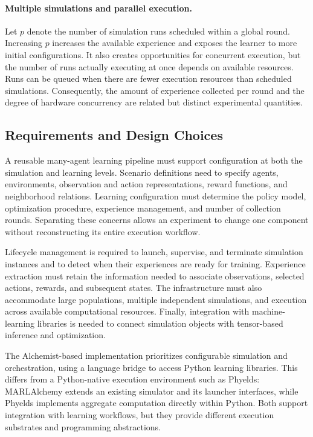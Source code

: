 \paragraph{Multiple simulations and parallel execution.}
Let $p$ denote the number of simulation runs scheduled within a global round.
%
Increasing $p$ increases the available experience and exposes the learner
 to more initial configurations.
%
It also creates opportunities for concurrent execution, but the number of
 runs actually executing at once depends on available resources.
%
Runs can be queued when there are fewer execution resources than scheduled
 simulations.
%
Consequently, the amount of experience collected per round and the degree
 of hardware concurrency are related but distinct experimental quantities.

\subsection{Requirements and Design Choices}
\label{sec:marlalchemy-requirements}

A reusable many-agent learning pipeline must support configuration at both
 the simulation and learning levels.
%
Scenario definitions need to specify agents, environments, observation and
 action representations, reward functions, and neighborhood relations.
%
Learning configuration must determine the policy model, optimization
 procedure, experience management, and number of collection rounds.
%
Separating these concerns allows an experiment to change one component
 without reconstructing its entire execution workflow.

Lifecycle management is required to launch, supervise, and terminate
 simulation instances and to detect when their experiences are ready
 for training.
%
Experience extraction must retain the information needed to associate
 observations, selected actions, rewards, and subsequent states.
%
The infrastructure must also accommodate large populations, multiple
 independent simulations, and execution across available computational
 resources.
%
Finally, integration with machine-learning libraries is needed to connect
 simulation objects with tensor-based inference and optimization.

The Alchemist-based implementation prioritizes configurable simulation and
 orchestration, using a language bridge to access Python learning libraries.
%
This differs from a Python-native execution environment such as Phyelds:
 MARLAlchemy extends an existing simulator and its launcher interfaces,
 while Phyelds implements aggregate computation directly within Python.
%
Both support integration with learning workflows, but they provide
 different execution substrates and programming abstractions.

